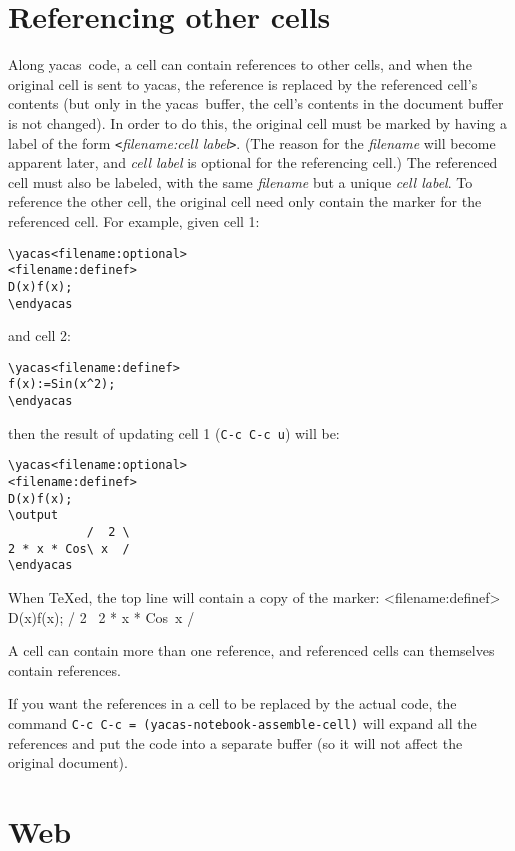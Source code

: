 \documentclass[12pt]{article}
\def\ys{\textsf{yacas}}
\begin{document}
\section{Referencing other cells}

Along \ys\ code, a cell can contain references to other cells, and
when the original cell is sent to \ys, the reference is replaced by
the referenced cell's contents (but only in the \ys\ buffer, the
cell's contents in the document buffer is not changed).  In order to
do this, the original cell must be marked by having a label of the
form \texttt{<}\textit{filename:cell label}\texttt{>}.  (The reason
for the \textit{filename} will become apparent later, and \textit{cell
  label} is optional for the referencing cell.)  The referenced cell
must also be labeled, with the same \textit{filename} but a unique
\textit{cell label}.  To reference the other cell, the original cell
need only contain the marker for the referenced cell.  For example,
given cell 1:
\begin{verbatim}
\yacas<filename:optional>
<filename:definef>
D(x)f(x);
\endyacas
\end{verbatim}
and cell 2:
\begin{verbatim}
\yacas<filename:definef>
f(x):=Sin(x^2);
\endyacas
\end{verbatim}
then the result of updating cell 1 (\texttt{C-c C-c u}) will be:
\begin{verbatim}
\yacas<filename:optional>
<filename:definef>
D(x)f(x);
\output
           /  2 \
2 * x * Cos\ x  /
\endyacas
\end{verbatim}
When \TeX{}ed, the top line will contain a copy of the marker:
\newpage
\yacas<filename:optional>
<filename:definef>
D(x)f(x);
\output
           /  2 \
2 * x * Cos\ x  /
\endyacas

A cell can contain more than one reference, and referenced cells can
themselves contain references.

If you want the references in a cell to be replaced by the actual
code, the command \texttt{C-c C-c = (yacas-notebook-assemble-cell)} will
expand all the references and put the code into a separate buffer (so
it will not affect the original document).

\section{Web}
\end{document}
